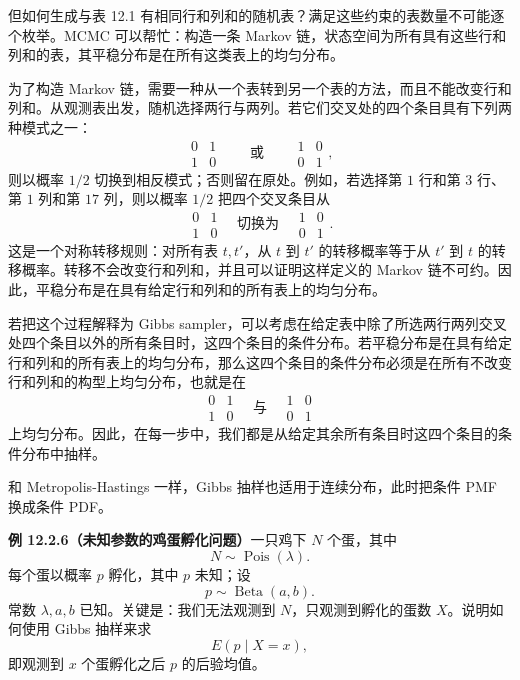 \documentclass[UTF8,12pt,a4paper,fontset=fandol]{ctexart}
\begin{document}
但如何生成与表 12.1 有相同行和列和的随机表？满足这些约束的表数量不可能逐个枚举。MCMC 可以帮忙：构造一条 Markov 链，状态空间为所有具有这些行和列和的表，其平稳分布是在所有这类表上的均匀分布。

为了构造 Markov 链，需要一种从一个表转到另一个表的方法，而且不能改变行和列和。从观测表出发，随机选择两行与两列。若它们交叉处的四个条目具有下列两种模式之一：
\[
  \begin{matrix}0&1\\1&0\end{matrix}
  \qquad\text{或}\qquad
  \begin{matrix}1&0\\0&1\end{matrix},
\]
则以概率 $1/2$ 切换到相反模式；否则留在原处。例如，若选择第 $1$ 行和第 $3$ 行、第 $1$ 列和第 $17$ 列，则以概率 $1/2$ 把四个交叉条目从
\[
  \begin{matrix}0&1\\1&0\end{matrix}
  \quad\text{切换为}\quad
  \begin{matrix}1&0\\0&1\end{matrix}.
\]
这是一个对称转移规则：对所有表 $t,t'$，从 $t$ 到 $t'$ 的转移概率等于从 $t'$ 到 $t$ 的转移概率。转移不会改变行和列和，并且可以证明这样定义的 Markov 链不可约。因此，平稳分布是在具有给定行和列和的所有表上的均匀分布。

若把这个过程解释为 Gibbs sampler，可以考虑在给定表中除了所选两行两列交叉处四个条目以外的所有条目时，这四个条目的条件分布。若平稳分布是在具有给定行和列和的所有表上的均匀分布，那么这四个条目的条件分布必须是在所有不改变行和列和的构型上均匀分布，也就是在
\[
  \begin{matrix}0&1\\1&0\end{matrix}
  \quad\text{与}\quad
  \begin{matrix}1&0\\0&1\end{matrix}
\]
上均匀分布。因此，在每一步中，我们都是从给定其余所有条目时这四个条目的条件分布中抽样。

和 Metropolis-Hastings 一样，Gibbs 抽样也适用于连续分布，此时把条件 PMF 换成条件 PDF。

\noindent\textbf{例 12.2.6（未知参数的鸡蛋孵化问题）}\quad 一只鸡下 $N$ 个蛋，其中
\[
  N\sim\operatorname{Pois}(\lambda).
\]
每个蛋以概率 $p$ 孵化，其中 $p$ 未知；设
\[
  p\sim\operatorname{Beta}(a,b).
\]
常数 $\lambda,a,b$ 已知。关键是：我们无法观测到 $N$，只观测到孵化的蛋数 $X$。说明如何使用 Gibbs 抽样来求
\[
  E(p\mid X=x),
\]
即观测到 $x$ 个蛋孵化之后 $p$ 的后验均值。
\end{document}
